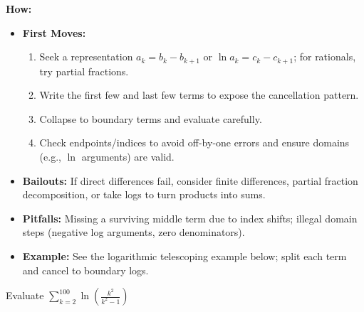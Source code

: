 \documentclass[12pt]{article}
\newenvironment{problem}[1]
{\begin{tcolorbox}[colback=blue!5!white,colframe=blue!75!black,title={#1}]}{\end{tcolorbox}}
\begin{document}
\textbf{How:}
\begin{itemize}
    \item \textbf{First Moves:}
    \begin{enumerate}[nosep]
        \item Seek a representation \(a_k = b_k - b_{k+1}\) or \(\ln a_k = c_k - c_{k+1}\); for rationals, try partial fractions.
        \item Write the first few and last few terms to expose the cancellation pattern.
        \item Collapse to boundary terms and evaluate carefully.
        \item Check endpoints/indices to avoid off-by-one errors and ensure domains (e.g., \(\ln\) arguments) are valid.
    \end{enumerate}
    \item \textbf{Bailouts:} If direct differences fail, consider finite differences, partial fraction decomposition, or take logs to turn products into sums.
    \item \textbf{Pitfalls:} Missing a surviving middle term due to index shifts; illegal domain steps (negative log arguments, zero denominators).
    \item \textbf{Example:} See the logarithmic telescoping example below; split each term and cancel to boundary logs.
\end{itemize}

\begin{problem}{Example: Series Evaluation}
Evaluate $\sum_{k=2}^{100} \ln\left(\frac{k^2}{k^2-1}\right)$
\end{problem}
\end{document}
